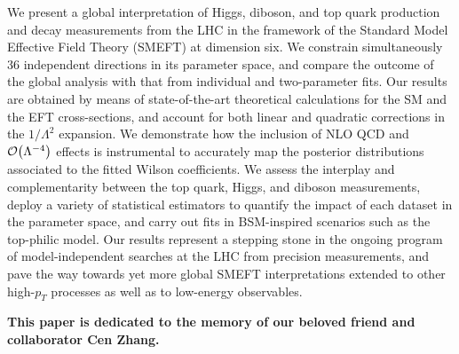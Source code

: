 \documentclass[11pt,a4paper]{article}
\newcommand{\lp}{\left(}
\newcommand{\rp}{\right)}
\let\originalleft\left
\let\originalright\right
\renewcommand{\left}{\mathopen{}\mathclose\bgroup\originalleft}
\renewcommand{\right}{\aftergroup\egroup\originalright}
\numberwithin{equation}{section}
\numberwithin{figure}{section}
\numberwithin{table}{section}
\begin{document}
\begin{titlepage}
We present a global interpretation of Higgs, diboson, and top quark
production and decay measurements from the LHC in the framework of the
Standard Model Effective Field Theory (SMEFT) at dimension six.
%
We constrain simultaneously 36 independent directions in its parameter space,
and compare the outcome of the global analysis  with that from
individual and two-parameter fits.
%
Our results are obtained by means of state-of-the-art theoretical
calculations for the SM and the EFT
cross-sections, and account for both linear and
quadratic corrections in the $1/\Lambda^2$
expansion.
%
We demonstrate how the inclusion of NLO QCD
and $\mathcal{O}\lp \Lambda^{-4}\rp$ effects
is instrumental to accurately map the  posterior distributions associated
to the fitted Wilson coefficients.
%
We assess the interplay and complementarity
 between  the top quark, Higgs, and diboson measurements,
 deploy a variety of statistical estimators to quantify the 
 impact of each dataset in the parameter space, and carry out
 fits in  BSM-inspired scenarios such as the top-philic model.
%
 Our results represent a stepping stone in the ongoing program of model-independent searches
  at the LHC from precision measurements, and pave the way
  towards yet more global SMEFT interpretations extended to other high-$p_T$ processes
   as well as to low-energy observables.

   \vspace{0.4cm}

   \begin{center}
\bf \small This paper is dedicated to the memory of our beloved friend and collaborator Cen Zhang.
   \end{center}  

\end{titlepage}

\restoregeometry

\tableofcontents








\appendix





\FloatBarrier

{}

%
%
\end{document}
